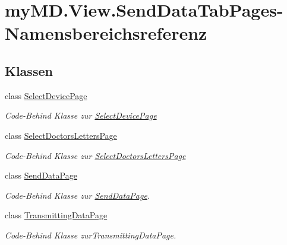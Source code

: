\hypertarget{namespacemy_m_d_1_1_view_1_1_send_data_tab_pages}{}\section{my\+M\+D.\+View.\+Send\+Data\+Tab\+Pages-\/\+Namensbereichsreferenz}
\label{namespacemy_m_d_1_1_view_1_1_send_data_tab_pages}
\subsection*{Klassen}
\begin{DoxyCompactItemize}
\item 
class \mbox{\hyperlink{classmy_m_d_1_1_view_1_1_send_data_tab_pages_1_1_select_device_page}{Select\+Device\+Page}}
\begin{DoxyCompactList}\small\item\em Code-\/\+Behind Klasse zur \mbox{\hyperlink{classmy_m_d_1_1_view_1_1_send_data_tab_pages_1_1_select_device_page}{Select\+Device\+Page}} \end{DoxyCompactList}\item 
class \mbox{\hyperlink{classmy_m_d_1_1_view_1_1_send_data_tab_pages_1_1_select_doctors_letters_page}{Select\+Doctors\+Letters\+Page}}
\begin{DoxyCompactList}\small\item\em Code-\/\+Behind Klasse zur \mbox{\hyperlink{classmy_m_d_1_1_view_1_1_send_data_tab_pages_1_1_select_doctors_letters_page}{Select\+Doctors\+Letters\+Page}} \end{DoxyCompactList}\item 
class \mbox{\hyperlink{classmy_m_d_1_1_view_1_1_send_data_tab_pages_1_1_send_data_page}{Send\+Data\+Page}}
\begin{DoxyCompactList}\small\item\em Code-\/\+Behind Klasse zur \mbox{\hyperlink{classmy_m_d_1_1_view_1_1_send_data_tab_pages_1_1_send_data_page}{Send\+Data\+Page}}. \end{DoxyCompactList}\item 
class \mbox{\hyperlink{classmy_m_d_1_1_view_1_1_send_data_tab_pages_1_1_transmitting_data_page}{Transmitting\+Data\+Page}}
\begin{DoxyCompactList}\small\item\em Code-\/\+Behind Klasse zur\+Transmitting\+Data\+Page. \end{DoxyCompactList}\end{DoxyCompactItemize}
